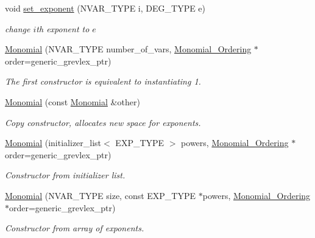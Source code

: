 \begin{Indent}
\begin{DoxyCompactItemize}
\mbox{\label{class_monomial_a6f28aa6d15979b018003908937155052}} 
void \hyperlink{class_monomial_a6f28aa6d15979b018003908937155052}{set\+\_\+exponent} (N\+V\+A\+R\+\_\+\+T\+Y\+PE i, D\+E\+G\+\_\+\+T\+Y\+PE e)
\begin{DoxyCompactList}\small\item\em change $i$th exponent to $e$ \end{DoxyCompactList}\item 
\mbox{\label{class_monomial_a3ab8ba96a6587eb480e0f390e83fea4b}} 
\hyperlink{class_monomial_a3ab8ba96a6587eb480e0f390e83fea4b}{Monomial} (N\+V\+A\+R\+\_\+\+T\+Y\+PE number\+\_\+of\+\_\+vars, \hyperlink{class_monomial___ordering}{Monomial\+\_\+\+Ordering} $\ast$order=generic\+\_\+grevlex\+\_\+ptr)
\begin{DoxyCompactList}\small\item\em The first constructor is equivalent to instantiating 1. \end{DoxyCompactList}\item 
\mbox{\label{class_monomial_ad6968b542cf22f8bc24053fb48782dcc}} 
\hyperlink{class_monomial_ad6968b542cf22f8bc24053fb48782dcc}{Monomial} (const \hyperlink{class_monomial}{Monomial} \&other)
\begin{DoxyCompactList}\small\item\em Copy constructor, allocates new space for exponents. \end{DoxyCompactList}\item 
\hyperlink{class_monomial_a6a46bc011c988af6c400a30bfd82dcba}{Monomial} (initializer\+\_\+list$<$ E\+X\+P\+\_\+\+T\+Y\+PE $>$ powers, \hyperlink{class_monomial___ordering}{Monomial\+\_\+\+Ordering} $\ast$order=generic\+\_\+grevlex\+\_\+ptr)
\begin{DoxyCompactList}\small\item\em Constructor from initializer list. \end{DoxyCompactList}\item 
\hyperlink{class_monomial_ad231cf8d07380505ff124e9c5b6087d5}{Monomial} (N\+V\+A\+R\+\_\+\+T\+Y\+PE size, const E\+X\+P\+\_\+\+T\+Y\+PE $\ast$powers, \hyperlink{class_monomial___ordering}{Monomial\+\_\+\+Ordering} $\ast$order=generic\+\_\+grevlex\+\_\+ptr)
\begin{DoxyCompactList}\small\item\em Constructor from array of exponents. \end{DoxyCompactList}\end{DoxyCompactItemize}
\end{Indent}
